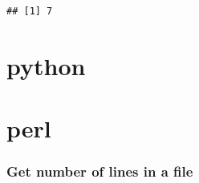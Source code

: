 \documentclass[]{book}
\newenvironment{Shaded}{\begin{snugshade}}{\end{snugshade}}
\newcommand{\BaseNTok}[1]{\textcolor[rgb]{0.00,0.00,0.81}{#1}}
\newcommand{\CharTok}[1]{\textcolor[rgb]{0.31,0.60,0.02}{#1}}
\newcommand{\DataTypeTok}[1]{\textcolor[rgb]{0.13,0.29,0.53}{#1}}
\newcommand{\FunctionTok}[1]{\textcolor[rgb]{0.00,0.00,0.00}{#1}}
\newcommand{\KeywordTok}[1]{\textcolor[rgb]{0.13,0.29,0.53}{\textbf{#1}}}
\newcommand{\NormalTok}[1]{#1}
\newcommand{\StringTok}[1]{\textcolor[rgb]{0.31,0.60,0.02}{#1}}
\begin{document}
\begin{verbatim}
## [1] 7
\end{verbatim}

\hypertarget{python}{%
\section{python}\label{python}}

\hypertarget{perl}{%
\section{perl}\label{perl}}

\hypertarget{get-number-of-lines-in-a-file}{%
\subsubsection{Get number of lines in a file}\label{get-number-of-lines-in-a-file}}

\begin{Shaded}
\end{Shaded}


\end{document}
